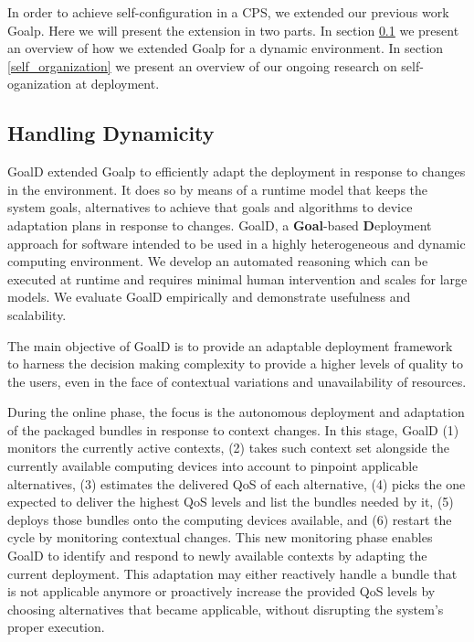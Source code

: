 \documentclass[conference]{IEEEtran}
\begin{document}
In order to achieve self-configuration in a CPS, we extended our previous work Goalp. Here we will present the extension in two parts. In section \ref{handling_dynamicity} we present an overview of how we extended Goalp for a dynamic environment\cite{rodrigues_goald:_2019}. In section \ref{self_organization} we present an overview of our ongoing research on self-oganization at deployment. 

\subsection{Handling Dynamicity}
\label{handling_dynamicity}

GoalD extended Goalp to efficiently adapt the deployment in response to changes in the environment. It does so by means of a runtime model that keeps the system goals, alternatives to achieve that goals and algorithms to device adaptation plans in response to changes. GoalD, a \textbf{Goal}-based \textbf{D}eployment approach for software intended to be used in a highly heterogeneous and dynamic computing environment. We develop an automated reasoning which can be executed at runtime and requires minimal human intervention and scales for large models. We evaluate GoalD empirically and demonstrate usefulness and scalability.

The main objective of GoalD is to provide an adaptable deployment framework to harness the decision making complexity to provide a higher levels of quality to the users, even in the face of contextual variations and unavailability of resources.

During the online phase, the focus is the autonomous deployment and adaptation of the packaged bundles in response to context changes. In this stage, GoalD (1) monitors the currently active contexts, (2) takes such context set alongside the currently available computing devices into account to pinpoint applicable alternatives, (3) estimates the delivered QoS of each alternative, (4) picks the one expected to deliver the highest QoS levels and list the bundles needed by it, (5) deploys those bundles onto the computing devices available, and (6) restart the cycle by monitoring contextual changes. This new monitoring phase enables GoalD to identify and respond to newly available contexts by adapting the current deployment. This adaptation may either reactively handle a bundle that is not applicable anymore or proactively increase the provided QoS levels by choosing alternatives that became applicable, without disrupting the system's proper execution.
\end{document}
